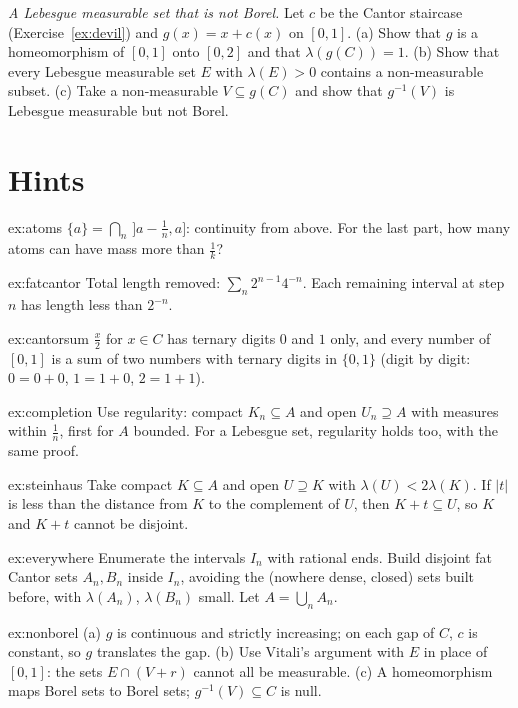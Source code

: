 \begin{exercise}[$\star\star\star$]\label{ex:nonborel}
\emph{A Lebesgue measurable set that is not Borel.} Let $c$ be the Cantor staircase (Exercise~\ref{ex:devil}) and $g(x)=x+c(x)$ on $[0,1]$. (a) Show that $g$ is a homeomorphism of $[0,1]$
onto $[0,2]$ and that $\lambda(g(C))=1$. (b) Show that every Lebesgue measurable set $E$ with $\lambda(E)>0$ contains a non-measurable subset. (c) Take a non-measurable
$V\subseteq g(C)$ and show that $g^{-1}(V)$ is Lebesgue measurable but not Borel.
\end{exercise}

\section{Hints}

\begin{hint}{ex:atoms}
$\{a\}=\bigcap_n\,]a-\frac1n,a]$: continuity from above. For the last part, how many atoms can have mass more than $\frac1k$?
\end{hint}
\begin{hint}{ex:fatcantor}
Total length removed: $\sum_n2^{n-1}4^{-n}$. Each remaining interval at step $n$ has length less than $2^{-n}$.
\end{hint}
\begin{hint}{ex:cantorsum}
$\frac x2$ for $x\in C$ has ternary digits $0$ and $1$ only, and every number of $[0,1]$ is a sum of two numbers with ternary digits in $\{0,1\}$ (digit by digit: $0=0+0$, $1=1+0$,
$2=1+1$).
\end{hint}
\begin{hint}{ex:completion}
Use regularity: compact $K_n\subseteq A$ and open $U_n\supseteq A$ with measures within $\frac1n$, first for $A$ bounded. For a Lebesgue set, regularity holds too, with the same proof.
\end{hint}
\begin{hint}{ex:steinhaus}
Take compact $K\subseteq A$ and open $U\supseteq K$ with $\lambda(U)<2\lambda(K)$. If $|t|$ is less than the distance from $K$ to the complement of $U$, then $K+t\subseteq U$, so $K$ and $K+t$ cannot be disjoint.
\end{hint}
\begin{hint}{ex:everywhere}
Enumerate the intervals $I_n$ with rational ends. Build disjoint fat Cantor sets $A_n,B_n$ inside $I_n$, avoiding the (nowhere dense, closed) sets built before, with
$\lambda(A_n)$, $\lambda(B_n)$ small. Let $A=\bigcup_nA_n$.
\end{hint}
\begin{hint}{ex:nonborel}
(a) $g$ is continuous and strictly increasing; on each gap of $C$, $c$ is constant, so $g$ translates the gap. (b) Use Vitali's argument with $E$ in place of $[0,1]$: the sets
$E\cap(V+r)$ cannot all be measurable. (c) A homeomorphism maps Borel sets to Borel sets; $g^{-1}(V)\subseteq C$ is null.
\end{hint}

